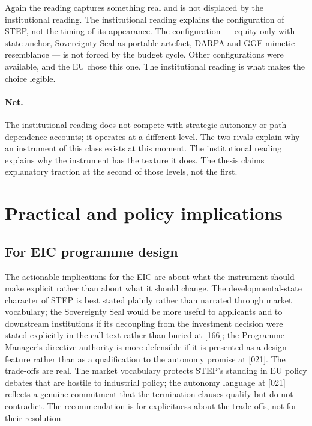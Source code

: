 Again the reading captures something real and is not displaced by the
institutional reading. The institutional reading explains the
configuration of STEP, not the timing of its appearance. The
configuration --- equity-only with state anchor, Sovereignty Seal as
portable artefact, DARPA and GGF mimetic resemblance --- is not
forced by the budget cycle. Other configurations were available, and the EU
chose this one. The institutional reading is what makes the choice
legible.

\paragraph{Net.}
The institutional reading does not compete with strategic-autonomy or
path-dependence accounts; it operates at a different level. The two
rivals explain why an instrument of this class exists at this moment.
The institutional reading explains why the instrument has the texture
it does. The thesis claims explanatory traction at the second of those
levels, not the first.

\section{Practical and policy implications}
\label{sec:disc-practice}

\subsection{For EIC programme design}
\label{sec:disc-prog-eic}

The actionable implications for the EIC are about what the instrument
should make explicit rather than about what it should change. The
developmental-state character of STEP is best stated plainly rather
than narrated through market vocabulary; the Sovereignty Seal would be
more useful to applicants and to downstream institutions if its
decoupling from the investment decision were stated explicitly in the
call text rather than buried at [166]; the Programme Manager's
directive authority is more defensible if it is presented as a design
feature rather than as a qualification to the autonomy promise at
[021]. The trade-offs are real. The market vocabulary protects STEP's
standing in EU policy debates that are hostile to industrial policy;
the autonomy language at [021] reflects a genuine commitment that the
termination clauses qualify but do not contradict. The recommendation
is for explicitness about the trade-offs, not for their resolution.

